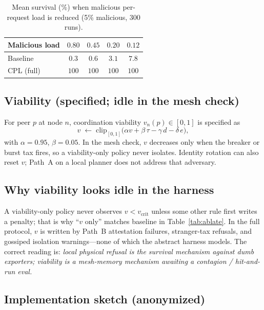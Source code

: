 \documentclass{article}
\begin{document}
\begin{table}[h]
\centering
\caption{Mean survival (\%) when malicious per-request load is reduced (5\% malicious, 300 runs).}
\label{tab:adapt}
{\small
\begin{tabular}{lcccc}
\toprule
Malicious load & $0.80$ & $0.45$ & $0.20$ & $0.12$ \\
\midrule
Baseline & $0.3$ & $0.6$ & $3.1$ & $7.8$ \\
CPL (full) & $100$ & $100$ & $100$ & $100$ \\
\bottomrule
\end{tabular}
}
\end{table}

\subsection{Viability (specified; idle in the mesh check)}
\label{app:cvp}

For peer $p$ at node $n$, coordination viability $v_n(p)\in[0,1]$ is specified as
\begin{equation}
    v \;\leftarrow\; \mathrm{clip}_{[0,1]}\!\bigl(\alpha v + \beta\,\tau - \gamma\,d - \delta\,e\bigr),
    \label{eq:cvp}
\end{equation}
with $\alpha=0.95$, $\beta=0.05$.
In the mesh check, $v$ decreases only when the breaker or burst tax fires, so a viability-only policy never isolates.
Identity rotation can also reset $v$; Path~A on a local planner does not address that adversary.

\subsection{Why viability looks idle in the harness}
\label{app:why}

A viability-only policy never observes $v<v_{\mathrm{crit}}$ unless some other rule first writes a penalty; that is why ``$v$ only'' matches baseline in Table~\ref{tab:ablate}.
In the full protocol, $v$ is written by Path~B attestation failures, stranger-tax refusals, and gossiped isolation warnings---none of which the abstract harness models.
The correct reading is: \emph{local physical refusal is the survival mechanism against dumb exporters; viability is a mesh-memory mechanism awaiting a contagion / hit-and-run eval.}

\subsection{Implementation sketch (anonymized)}
\label{app:impl}
\end{document}
